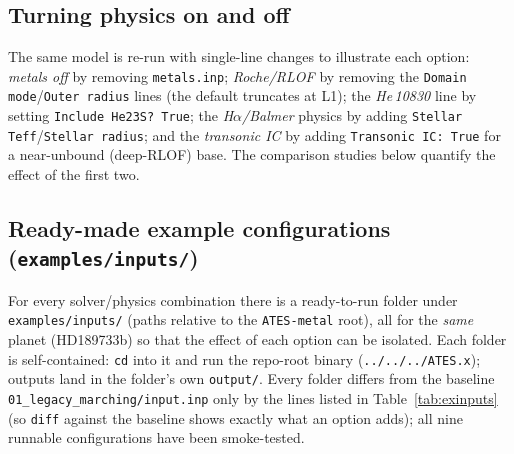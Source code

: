 \documentclass[english,a4paper]{kiseon_memo}
\begin{document}
\subsection{Turning physics on and off}
The same model is re-run with single-line changes to illustrate each option:
\emph{metals off} by removing \texttt{metals.inp}; \emph{Roche/RLOF} by removing
the \texttt{Domain mode}/\texttt{Outer radius} lines (the default truncates at
L1); the \emph{He\,10830} line by setting \texttt{Include He23S? True}; the
\emph{H$\alpha$/Balmer} physics by adding \texttt{Stellar Teff}/\texttt{Stellar
radius}; and the \emph{transonic IC} by adding \texttt{Transonic IC: True} for a
near-unbound (deep-RLOF) base. The comparison studies below quantify the effect
of the first two.

\subsection{Ready-made example configurations (\texttt{examples/inputs/})}
\label{sec:exinputs}
For every solver/physics combination there is a ready-to-run folder under
\texttt{examples/inputs/} (paths relative to the \texttt{ATES-metal} root),
all for the \emph{same} planet (HD189733b) so that the effect of each option can
be isolated. Each folder is self-contained: \texttt{cd} into it and run the
repo-root binary (\texttt{../../../ATES.x}); outputs land in the folder's own
\texttt{output/}. Every folder differs from the baseline
\texttt{01\_legacy\_marching/input.inp} only by the lines listed in
Table~\ref{tab:exinputs} (so \texttt{diff} against the baseline shows exactly
what an option adds); all nine runnable configurations have been smoke-tested.
\end{document}
